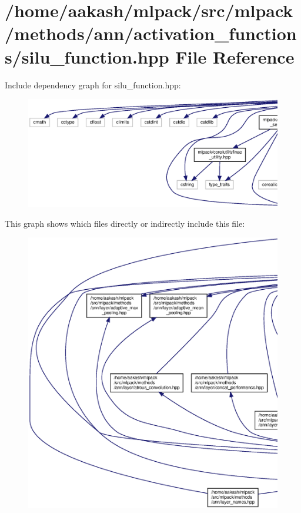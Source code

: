\section{/home/aakash/mlpack/src/mlpack/methods/ann/activation\+\_\+functions/silu\+\_\+function.hpp File Reference}
\label{silu__function_8hpp}
Include dependency graph for silu\+\_\+function.\+hpp\+:
\nopagebreak
\begin{figure}[H]
\begin{center}
\leavevmode
\includegraphics[width=350pt]{silu__function_8hpp__incl}
\end{center}
\end{figure}
This graph shows which files directly or indirectly include this file\+:
\nopagebreak
\begin{figure}[H]
\begin{center}
\leavevmode
\includegraphics[width=350pt]{silu__function_8hpp__dep__incl}
\end{center}
\end{figure}

